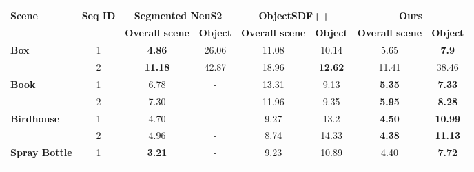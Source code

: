 \begin{table}[t]
\resizebox{\linewidth}{!} {
    \begin{tabular}{|l|c|cc|cc|cc|}
\hline
\textbf{Scene}                         & \textbf{Seq ID} & \multicolumn{2}{c|}{\textbf{Segmented NeuS2}}                 & \multicolumn{2}{c|}{\textbf{ObjectSDF++}}                     & \multicolumn{2}{c|}{\textbf{Ours}}                            \\ \hline
                                       & \textbf{}       & \multicolumn{1}{c|}{\textbf{Overall scene}} & \textbf{Object} & \multicolumn{1}{c|}{\textbf{Overall scene}} & \textbf{Object} & \multicolumn{1}{c|}{\textbf{Overall scene}} & \textbf{Object} \\ \hline
\multirow{2}{*}{\textbf{Box}}          & 1               & \multicolumn{1}{c|}{\textbf{4.86}}          & 26.06           & \multicolumn{1}{c|}{11.08}                  & 10.14           & \multicolumn{1}{c|}{5.65}                   & \textbf{7.9}    \\ \cline{2-8} 
                                       & 2               & \multicolumn{1}{c|}{\textbf{11.18}}         & 42.87           & \multicolumn{1}{c|}{18.96}                  & \textbf{12.62}  & \multicolumn{1}{c|}{11.41}                  & 38.46           \\ \hline
\multirow{2}{*}{\textbf{Book}}         & 1               & \multicolumn{1}{c|}{6.78}                   & -               & \multicolumn{1}{c|}{13.31}                  & 9.13            & \multicolumn{1}{c|}{\textbf{5.35}}          & \textbf{7.33}   \\ \cline{2-8} 
                                       & 2               & \multicolumn{1}{c|}{7.30}                   & -               & \multicolumn{1}{c|}{11.96}                  & 9.35            & \multicolumn{1}{c|}{\textbf{5.95}}          & \textbf{8.28}   \\ \hline
\multirow{2}{*}{\textbf{Birdhouse}}    & 1               & \multicolumn{1}{c|}{4.70}                   & -               & \multicolumn{1}{c|}{9.27}                   & 13.2            & \multicolumn{1}{c|}{\textbf{4.50}}          & \textbf{10.99}  \\ \cline{2-8} 
                                       & 2               & \multicolumn{1}{c|}{4.96}                   & -               & \multicolumn{1}{c|}{8.74}                   & 14.33           & \multicolumn{1}{c|}{\textbf{4.38}}          & \textbf{11.13}  \\ \hline
\multirow{2}{*}{\textbf{Spray Bottle}} & 1               & \multicolumn{1}{c|}{\textbf{3.21}}          & -               & \multicolumn{1}{c|}{9.23}                   & 10.89           & \multicolumn{1}{c|}{4.40}                   & \textbf{7.72}   \\ \cline{2-8} 

\end{tabular}}
\end{table}

